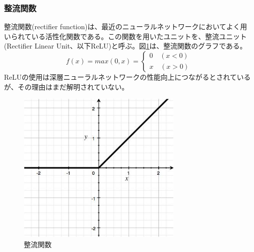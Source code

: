 \subsubsection{整流関数}
整流関数(rectifier function)は、最近のニューラルネットワークにおいてよく用いられている活性化関数である。この関数を用いたユニットを、整流ユニット(Rectifier Linear Unit、以下ReLU)と呼ぶ。図\ref{c3_rectifier}は、整流関数のグラフである。
\begin{equation}
f(x) = max(0, x) = \left\{\begin{array}{cc} 0\quad (x < 0)\\ x \quad (x > 0)\end{array}\right.
\end{equation}
ReLUの使用は深層ニューラルネットワークの性能向上につながるとされているが、その理由はまだ解明されていない。%

\begin{figure}[tbp]
 \centering
  \includegraphics[width=80mm]{img/c3/rectifier}
 \caption{整流関数}
 \label{c3_rectifier}
\end{figure}

